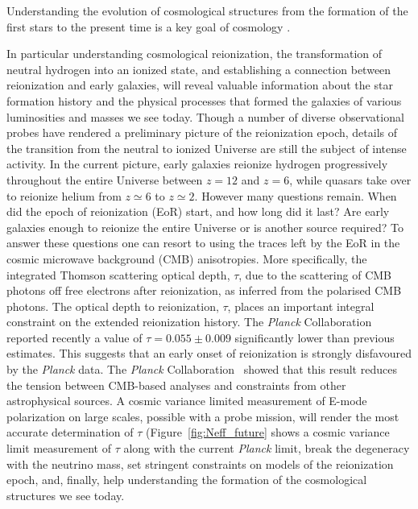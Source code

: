 \vspace{-0.05in}

Understanding the evolution of cosmological structures from the formation of the
first stars to the present time is a key goal of cosmology \citep{dunlop2011}. 


In particular understanding cosmological reionization, the transformation of neutral
hydrogen into an ionized state, and establishing a connection between reionization and early galaxies, will 
reveal valuable information about the star formation history and the physical processes that formed the galaxies of various luminosities and masses we see today. 
 Though a number of diverse observational probes have rendered a preliminary picture of the reionization epoch, details of the transition from the neutral to ionized 
 Universe are still the subject of intense activity. 
In the current picture, early galaxies reionize hydrogen progressively throughout the entire Universe between $z = 12$ and $z  = 6$,
while quasars take over to reionize helium from $z \simeq 6$ to $z \simeq 2$. However many questions remain. When did the epoch of reionization
(EoR) start, and how long did it last? Are early galaxies enough to reionize the entire Universe or is another source required?
To answer these questions one can resort to using the traces left by the EoR in the cosmic microwave background (CMB) anisotropies.
More specifically, the integrated Thomson scattering optical depth, $\tau$, due to the scattering of CMB photons off free electrons after reionization, 
as inferred from the polarised CMB photons. 
The optical depth to reionization, $\tau$, places an important integral constraint on the extended reionization history.
The {\it Planck} Collaboration~\cite{planck2015-XLVI,planck2015-XXXI} reported recently a value of $\tau=0.055 \pm 0.009$ significantly lower than previous estimates. 
This suggests that an early onset of reionization is strongly disfavoured by the {\it Planck} data. 
The {\it Planck} Collaboration~\cite{planck2015-XXXI} showed that this result reduces the tension between CMB-based analyses and constraints from 
other astrophysical sources. 
A cosmic variance limited measurement of E-mode polarization on large scales, possible with a probe mission, will render the most accurate 
determination of $\tau$ (Figure~\ref{fig:Neff_future}
shows a cosmic variance limit measurement of $\tau$ along with the current {\it Planck} limit, break the degeneracy with the neutrino mass, 
set stringent constraints on models of the reionization epoch, and, finally, help understanding the formation of the cosmological structures we see today.


